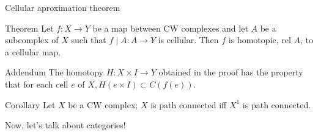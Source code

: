\documentclass{beamer}
\begin{document}
\begin{frame}{Cellular aproximation theorem}
    \begin{block}{Theorem}
Let $f: X \rightarrow Y$ be a map between CW complexes and let $A$ be a subcomplex of $X$ such that $f \mid A: A \rightarrow Y$ is cellular. Then $f$ is homotopic, rel $A$, to a cellular map.
    \end{block}
\end{frame}

\begin{frame}
\begin{block}{Addendum}
The homotopy $H: X \times I \rightarrow Y$ obtained in the proof has the property that for each cell $e$ of $X, H(e \times I) \subset C(f(e))$.
\end{block}
\bigskip
\begin{block}{Corollary}
    Let $X$ be a CW complex; $X$ is path connected iff $X^1$ is path connected.
\end{block}
\end{frame}

\begin{frame}
\vfill
\centering
\alert{Now, let's talk about categories!}
\vfill
\end{frame}
\end{document}
